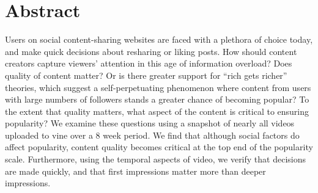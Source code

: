 \section{Abstract}
Users on social content-sharing websites are faced with a plethora of choice today, and make quick decisions about resharing or liking posts. How should content creators  capture viewers' attention in this age of information overload? Does quality of content matter? Or is there greater support for  ``rich gets richer'' theories, which suggest a self-perpetuating phenomenon where content from users with large numbers of followers stands a greater chance of becoming popular?  To the extent that quality matters, what aspect of the content is critical to ensuring popularity? We examine these questions using a snapshot of nearly all videos uploaded to vine over a 8 week period. We find that although social factors do affect popularity, content quality becomes critical at the top end of the popularity scale. Furthermore, using the temporal aspects of video, we verify that decisions are made quickly, and that first impressions matter more than deeper impressions. %


